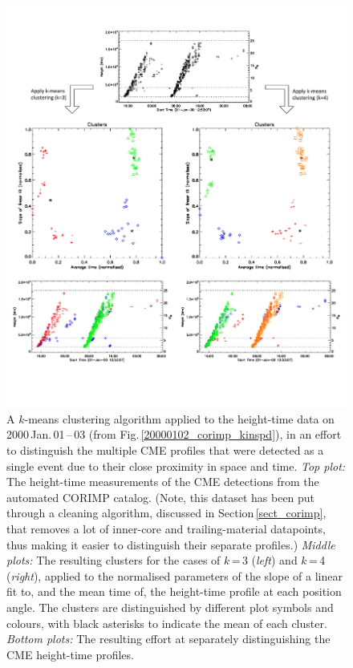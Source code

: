 \documentclass[referee,a4paper,12pt,traditabstract]{swsc}
\begin{document}
\begin{figure}[t]
\centerline{\includegraphics[scale=0.578, trim=0 95 0 50, clip=true]{20000101_cluster_kins_input.pdf}}
\caption{A $k$-means clustering algorithm applied to the height-time data on 2000\,Jan.\,01\,--\,03 (from Fig.\,\ref{20000102_corimp_kinspd}), in an effort to distinguish the multiple CME profiles that were detected as a single event due to their close proximity in space and time. \emph{Top plot:} The height-time measurements of the CME detections from the automated CORIMP catalog. (Note, this dataset has been put through a cleaning algorithm, discussed in Section\,\ref{sect_corimp}, that removes a lot of inner-core and trailing-material datapoints, thus making it easier to distinguish their separate profiles.) \emph{Middle plots:} The resulting clusters for the cases of $k$\,=\,3 (\emph{left}) and $k$\,=\,4 (\emph{right}), applied to the normalised parameters of the slope of a linear fit to, and the mean time of, the height-time profile at each position angle. The clusters are distinguished by different plot symbols and colours, with black asterisks to indicate the mean of each cluster. \emph{Bottom plots:} The resulting effort at separately distinguishing the CME height-time profiles.
}
\label{20000101_cluster_kins}
\end{figure}
\end{document}
